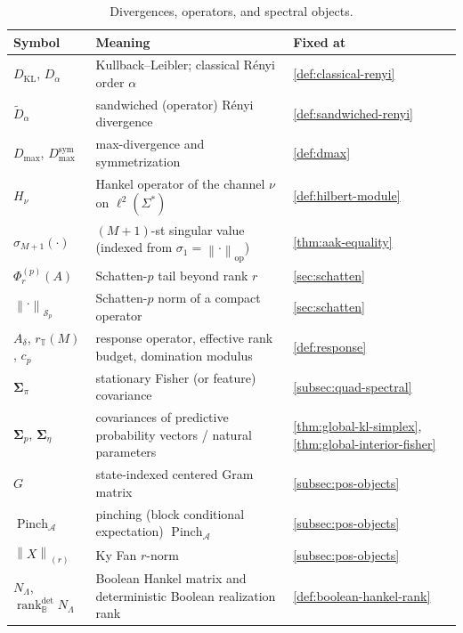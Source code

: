 \documentclass[12pt]{article}
\theoremstyle{definition}
\newcommand{\norm}[1]{\left\lVert#1\right\rVert}
\newcommand{\Sp}[1]{\mathcal S_{#1}}
\newcommand{\rankBdet}{\operatorname{rank}_{\mathbb B}^{\mathrm{det}}}
\newcommand{\EA}{\operatorname{Pinch}_{\mathcal A}}
\newcommand{\KyF}[2]{\left\|#1\right\|_{(#2)}}
\newcommand{\Ren}[1]{D_{#1}}
\newcommand{\sRen}[1]{\widetilde D_{#1}}
\newcommand{\KL}{D_{\mathrm{KL}}}
\newcommand{\Dmax}{D_{\max}}
\newcommand{\Dmaxsym}{D_{\max}^{\mathrm{sym}}}
\begin{document}
\begin{table}[htbp]
\centering
\small
\caption{Divergences, operators, and spectral objects.}
\label{tab:notation-operators}
\begin{tabular}{@{}p{3.5cm}p{7.7cm}p{2.8cm}@{}}
\toprule
\textbf{Symbol} & \textbf{Meaning} & \textbf{Fixed at} \\
\midrule
$\KL$, $\Ren{\alpha}$ & Kullback--Leibler; classical R\'enyi order
$\alpha$ & \ref{def:classical-renyi} \\[2pt]
$\sRen{\alpha}$ & sandwiched (operator) R\'enyi divergence &
\ref{def:sandwiched-renyi} \\[2pt]
$\Dmax$, $\Dmaxsym$ & max-divergence and symmetrization &
\ref{def:dmax} \\[2pt]
$H_\nu$ & Hankel operator of the channel $\nu$ on $\ell^2(\Sigma^*)$ &
\ref{def:hilbert-module} \\[2pt]
$\sigma_{M+1}(\cdot)$ & $(M+1)$-st singular value (indexed from
$\sigma_1=\norm{\cdot}_{\mathrm{op}}$) & \ref{thm:aak-equality} \\[2pt]
$\Phi^{(p)}_r(A)$ & Schatten-$p$ tail beyond rank $r$ &
\ref{sec:schatten} \\[2pt]
$\norm{\cdot}_{\Sp{p}}$ & Schatten-$p$ norm of a compact operator &
\ref{sec:schatten} \\[2pt]
$A_\delta$, $r_{\mathbb T}(M)$, $c_p$ & response operator, effective rank
budget, domination modulus & \ref{def:response} \\[2pt]
$\bm{\Sigma}_\pi$ & stationary Fisher (or feature) covariance &
\ref{subsec:quad-spectral} \\[2pt]
$\bm{\Sigma}_p$, $\bm{\Sigma}_\eta$ & covariances of predictive probability
vectors / natural parameters & \ref{thm:global-kl-simplex},
\ref{thm:global-interior-fisher} \\[2pt]
$G$ & state-indexed centered Gram matrix &
\ref{subsec:pos-objects} \\[2pt]
$\EA$ & pinching (block conditional expectation) $\operatorname{Pinch}_{\mathcal A}$ &
\ref{subsec:pos-objects} \\[2pt]
$\KyF{X}{r}$ & Ky Fan $r$-norm & \ref{subsec:pos-objects} \\[2pt]
$N_\Lambda$, $\rankBdet N_\Lambda$ & Boolean Hankel matrix and
deterministic Boolean realization rank & \ref{def:boolean-hankel-rank} \\
\bottomrule
\end{tabular}
\end{table}
\end{document}
